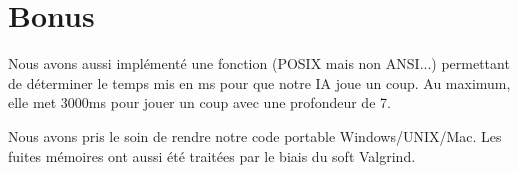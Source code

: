 \documentclass[a4paper,10pt]{article}
\begin{document}
\section{Bonus}

Nous avons aussi implémenté une fonction (POSIX mais non ANSI...) permettant de déterminer le temps mis en ms pour que notre IA joue un coup.
Au maximum, elle met 3000ms pour jouer un coup avec une profondeur de 7.

Nous avons pris le soin de rendre notre code portable Windows/UNIX/Mac.
Les fuites mémoires ont aussi été traitées par le biais du soft Valgrind.
\end{document}
